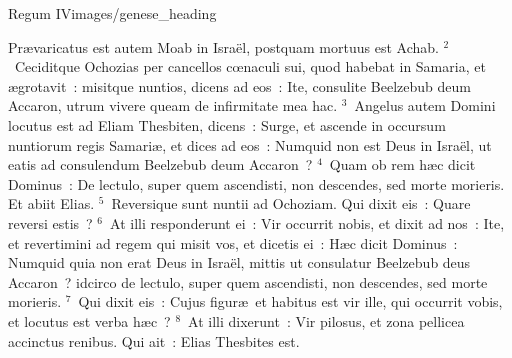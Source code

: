{Regum IV}{images/genese_heading}


\lettrine[lines=10,image=true,loversize=0.05,lraise=-0.03]{P}{}r\ae varicatus est autem Moab in Isra\"el, postquam mortuus est Achab.
${}^{2}$~Ceciditque Ochozias per cancellos cœnaculi sui, quod habebat in Samaria, et \ae grotavit~: misitque nuntios, dicens ad eos~: Ite, consulite Beelzebub deum Accaron, utrum vivere queam de infirmitate mea hac.
${}^{3}$~Angelus autem Domini locutus est ad Eliam Thesbiten, dicens~: Surge, et ascende in occursum nuntiorum regis Samari\ae , et dices ad eos~: Numquid non est Deus in Isra\"el, ut eatis ad consulendum Beelzebub deum Accaron~?
${}^{4}$~Quam ob rem h\ae c dicit Dominus~: De lectulo, super quem ascendisti, non descendes, sed morte morieris. Et abiit Elias.
${}^{5}$~Reversique sunt nuntii ad Ochoziam. Qui dixit eis~: Quare reversi estis~?
${}^{6}$~At illi responderunt ei~: Vir occurrit nobis, et dixit ad nos~: Ite, et revertimini ad regem qui misit vos, et dicetis ei~: H\ae c dicit Dominus~: Numquid quia non erat Deus in Isra\"el, mittis ut consulatur Beelzebub deus Accaron~? idcirco de lectulo, super quem ascendisti, non descendes, sed morte morieris.
${}^{7}$~Qui dixit eis~: Cujus figur\ae\ et habitus est vir ille, qui occurrit vobis, et locutus est verba h\ae c~?
${}^{8}$~At illi dixerunt~: Vir pilosus, et zona pellicea accinctus renibus. Qui ait~: Elias Thesbites est.


